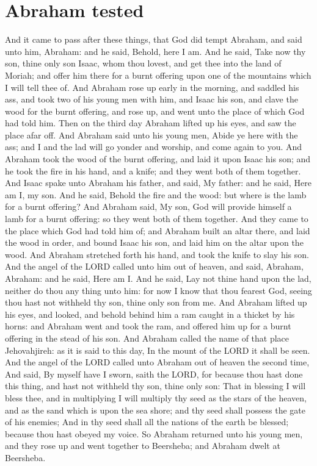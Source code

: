 \section*{Abraham tested}
\begin{biblechapter} %
\verse And it came to pass after these things, that God did tempt Abraham, and said unto him, Abraham: and he said, Behold, here I am.
\verse And he said, Take now thy son, thine only son Isaac, whom thou lovest, and get thee into the land of Moriah; and offer him there for a burnt offering upon one of the mountains which I will tell thee of.
\verse And Abraham rose up early in the morning, and saddled his ass, and took two of his young men with him, and Isaac his son, and clave the wood for the burnt offering, and rose up, and went unto the place of which God had told him.
\verse Then on the third day Abraham lifted up his eyes, and saw the place afar off.
\verse And Abraham said unto his young men, Abide ye here with the ass; and I and the lad will go yonder and worship, and come again to you.
\verse And Abraham took the wood of the burnt offering, and laid it upon Isaac his son; and he took the fire in his hand, and a knife; and they went both of them together.
\verse And Isaac spake unto Abraham his father, and said, My father: and he said, Here am I, my son. And he said, Behold the fire and the wood: but where is the lamb for a burnt offering?
\verse And Abraham said, My son, God will provide himself a lamb for a burnt offering: so they went both of them together.
\verse And they came to the place which God had told him of; and Abraham built an altar there, and laid the wood in order, and bound Isaac his son, and laid him on the altar upon the wood.
\verse And Abraham stretched forth his hand, and took the knife to slay his son.
\verse And the angel of the LORD called unto him out of heaven, and said, Abraham, Abraham: and he said, Here am I.
\verse And he said, Lay not thine hand upon the lad, neither do thou any thing unto him: for now I know that thou fearest God, seeing thou hast not withheld thy son, thine only son from me.
\verse And Abraham lifted up his eyes, and looked, and behold behind him a ram caught in a thicket by his horns: and Abraham went and took the ram, and offered him up for a burnt offering in the stead of his son.
\verse And Abraham called the name of that place Jehovahjireh: as it is said to this day, In the mount of the LORD it shall be seen.
\verse And the angel of the LORD called unto Abraham out of heaven the second time,
\verse And said, By myself have I sworn, saith the LORD, for because thou hast done this thing, and hast not withheld thy son, thine only son:
\verse That in blessing I will bless thee, and in multiplying I will multiply thy seed as the stars of the heaven, and as the sand which is upon the sea shore; and thy seed shall possess the gate of his enemies;
\verse And in thy seed shall all the nations of the earth be blessed; because thou hast obeyed my voice.
\verse So Abraham returned unto his young men, and they rose up and went together to Beersheba; and Abraham dwelt at Beersheba.

\end{biblechapter}
